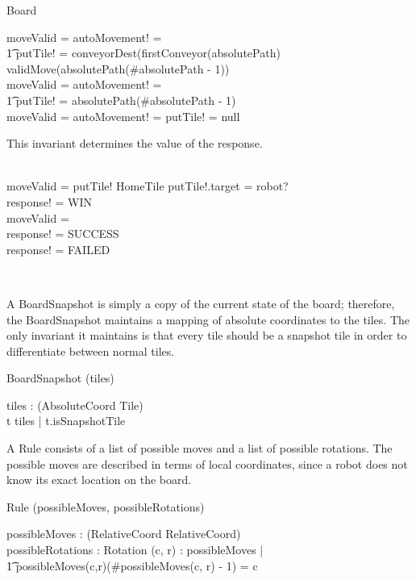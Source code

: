 \documentclass[12pt]{article}
\begin{document}
\begin{class}{Board}
\begin{notopschema}
\THEN moveValid = \true \wedge autoMovement! = \true \;\; \wedge \\ \t1 putTile! = conveyorDest(firstConveyor(absolutePath) \\
\ELSE \IF validMove(absolutePath(\#absolutePath - 1)) \\
\THEN moveValid = \true \wedge autoMovement! = \false \; \; \wedge \\ \t1  putTile! = absolutePath(\#absolutePath - 1) \\
\ELSE moveValid = \false \wedge autoMovement! = \false \wedge putTile! = null \\
\also \also \also
\begin{zpar}
This invariant determines the value of the response.
\end{zpar} \\
\IF moveValid = \true \wedge putTile! \in HomeTile \wedge putTile!.target = robot? \\
\THEN response! = WIN \\
\ELSE \IF moveValid = \true \\
\THEN response! = SUCCESS \\
\ELSE response! = FAILED
\end{notopschema} \\
\end{class}

A BoardSnapshot is simply a copy of the current state of the board; therefore, the BoardSnapshot maintains a mapping of absolute coordinates to the tiles. The only invariant it maintains is that every tile should be a snapshot tile in order to differentiate between normal tiles.
\begin{class}{BoardSnapshot}
\upharpoonright (tiles) \\
\begin{state}
tiles : \power (AbsoluteCoord \fun Tile) \\
\where
\forall t \ran tiles | t.isSnapshotTile
\end{state}
\end{class}

A Rule consists of a list of possible moves and a list of possible rotations. The possible moves are described in terms of local coordinates, since a robot does not know its exact location on the board.
\begin{class}{Rule}
\upharpoonright (possibleMoves, possibleRotations) \\
\begin{state}
possibleMoves : \power (RelativeCoord \pfun \seq RelativeCoord) \\
possibleRotations : \power Rotation
\where
\forall (c, r) : \dom possibleMoves | \\ \t1 possibleMoves(c,r)(\#possibleMoves(c, r) - 1) = c
\end{state} \\
\end{class}
\end{document}
